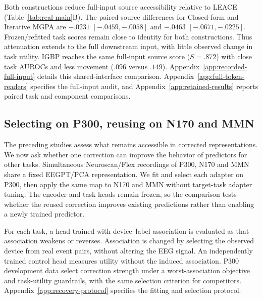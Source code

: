 Both constructions reduce full-input source accessibility relative to
LEACE (Table~\ref{tab:real-main}B). The paired source differences for
Closed-form and Iterative MGPA
are $-.0231$ $[-.0459,-.0058]$ and $-.0463$ $[-.0671,-.0225]$.
Frozen/refitted task scores remain close to identity for both constructions.
Thus attenuation extends to the full downstream input, with little observed
change in task utility. IGBP reaches the same full-input source score
($S=.872$) with close task AUROCs and less movement ($.096$ versus $.149$).
Appendix~\ref{app:recorded-full-input} details this
shared-interface comparison. Appendix~\ref{app:full-token-readers} specifies
the full-input audit, and Appendix~\ref{app:retained-results} reports paired
task and component comparisons.

\subsection{Selecting on P300, reusing on N170 and MMN}
\label{sec:recovery}
The preceding studies assess what remains accessible in corrected
representations. We now ask whether one correction can improve the behavior
of predictors for other tasks. Simultaneous Neuroscan/Flex recordings of
P300, N170 and MMN share a fixed EEGPT/PCA representation. We fit and select
each adapter on P300, then apply the same map to N170 and MMN without
target-task adapter tuning. The encoder and task heads remain frozen, so the
comparison tests whether the reused correction improves existing predictions
rather than enabling a newly trained predictor.

For each task, a head trained with device--label association is evaluated
as that association weakens or reverses. Association is changed by selecting
the observed device from real event pairs, without altering the EEG signal.
An independently trained control head measures utility without the induced
association. P300 development data select correction strength under a
worst-association objective and task-utility guardrails, with the same
selection criterion for competitors. Appendix~\ref{app:recovery-protocol}
specifies the fitting and selection protocol.

\begin{table}[htbp]
\centering\small
\caption{\textbf{One P300-selected correction, three frozen task heads.}
Eight common participants; worst-association AUROC of shortcut-trained
heads and independent-regime AUROC of separate control heads. Iterative
scores average three fits, each with an unchanged P300-selected map.
For each fit, worst is the minimum participant-mean AUROC
over association strength. Paired intervals and per-fit results are in
Appendix~\ref{app:transfer-results}.}
\label{tab:reuse-main}

\end{table}

